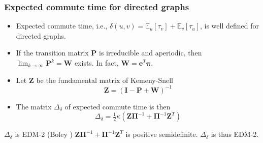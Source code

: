 \documentclass[professionalfonts, hyperref={pdfpagelabels=false,
  colorlinks=true, linkcolor=purple}]{beamer}
\begin{document}
\begin{frame}
  \frametitle{Expected commute time for directed graphs}
  \begin{itemize}
  \item Expected commute time, i.e., $\delta(u,v) = \mathbb{E}_{u}[\tau_v] +
    \mathbb{E}_{v}[\tau_u]$, is well defined for directed graphs.
  \item If the transition matrix $\bm{P}$ is \alert{irreducible}
    and \alert{aperiodic}, then $\lim_{k \rightarrow \infty}
    \bm{P}^{k} = \bm{W}$ exists. In fact, $\bm{W} = \bm{e}^{T}
    \bm{\pi}$.
  \item Let $\bm{Z}$ be the \alert{fundamental matrix} of
    Kemeny-Snell \cite{kemeny83:_finit_markov_chain}
    \begin{equation}
      \label{eq:26}
      \bm{Z} = (\bm{I} - \bm{P} + \bm{W})^{-1}
    \end{equation}
  \item The matrix $\Delta_{\delta}$ of expected commute time is
    then \cite{kemeny83:_finit_markov_chain}
    \begin{equation}
      \label{eq:27}
      \Delta_{\delta} = \tfrac{1}{2} \kappa(\bm{Z}\bm{\Pi}^{-1} +
      \bm{\Pi}^{-1} \bm{Z}^{T}) 
    \end{equation}
  \end{itemize}
    \begin{exampleblock}{$\Delta_\delta$ is EDM-2
        (Boley \cite{boley09:_gener_laplac})}
      $\bm{Z}\bm{\Pi}^{-1} + \bm{\Pi}^{-1} \bm{Z}^{T}$ is
      positive semidefinite. $\Delta_{\delta}$ is thus EDM-2.
  \end{exampleblock}
\end{frame}
\end{document}
